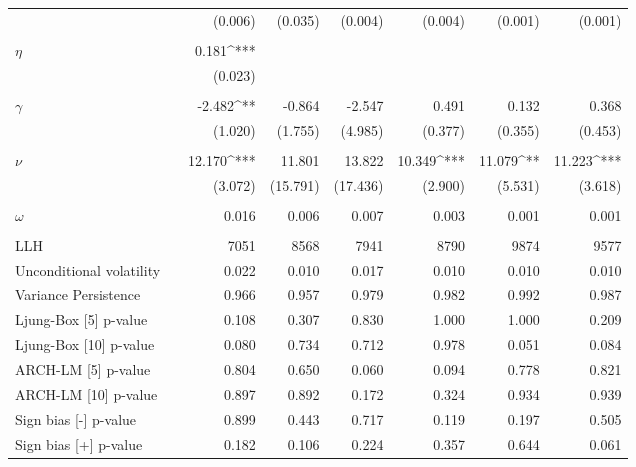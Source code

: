 \begin{table}[!ht]
\begin{tabularx}{\textwidth}{@{}l X dddddd @{}}
               && (0.006) & (0.035) & (0.004) & (0.004) & (0.001) & (0.001) \\
               \\
    $\eta$     && 0.181^{***} &  & \\
               && (0.023) &  & & \\
               \\
    $\gamma$   && -2.482^{**} & -0.864 & -2.547 & 0.491 & 0.132 & 0.368 \\
               && (1.020) & (1.755) & (4.985) & (0.377) & (0.355) & (0.453) \\
               \\
    $\nu$      && 12.170^{***} & 11.801 & 13.822 & 10.349^{***} & 11.079^{**} & 11.223^{***}\\
               && (3.072) & (15.791) & (17.436) & (2.900) & (5.531) & (3.618) \\
               \\
    $\omega$   && 0.016 & 0.006 & 0.007 & 0.003 & 0.001 & 0.001 \\
               && \\
    \midrule
    LLH && 7051 & 8568 & 7941 & 8790 & 9874 & 9577 \\
    Unconditional volatility && 0.022 & 0.010 & 0.017 & 0.010 & 0.010 & 0.010 \\
    Variance Persistence   && 0.966 & 0.957 & 0.979 & 0.982 & 0.992 & 0.987 \\
    Ljung-Box [5] p-value  && 0.108 & 0.307 & 0.830 & 1.000 & 1.000 & 0.209 \\
    Ljung-Box [10] p-value && 0.080 & 0.734 & 0.712 & 0.978 & 0.051 & 0.084 \\
    ARCH-LM [5] p-value    && 0.804 & 0.650 & 0.060 & 0.094 & 0.778 & 0.821 \\
    ARCH-LM [10] p-value   && 0.897 & 0.892 & 0.172 & 0.324 & 0.934 & 0.939 \\
    Sign bias [-] p-value  && 0.899 & 0.443 & 0.717 & 0.119 & 0.197 & 0.505 \\
    Sign bias [+] p-value  && 0.182 & 0.106 & 0.224 & 0.357 & 0.644 & 0.061 \\
    \bottomrule
  \end{tabularx}

  \label{tab:garch_estimation}
\end{table}
